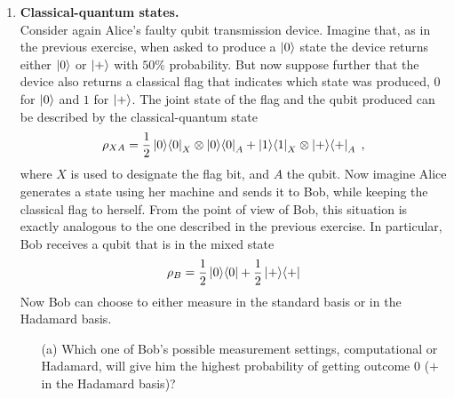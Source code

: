 \documentclass[12pt]{article}
\begin{document}
\begin{enumerate}
\item {\bf Classical-quantum states.}\\
Consider again Alice's faulty qubit transmission device. Imagine that, as in the previous exercise, when asked to produce a $\ket{0}$ state the device returns either $\ket{0}$ or $\ket{+}$ with $50\%$ probability. But now suppose further that the device also returns a classical flag that indicates which state was produced, $0$ for $\ket{0}$ and $1$ for $\ket{+}$. The joint state of the flag and the qubit produced can be described by the classical-quantum state
\begin{equation}
\rho_{XA} = \frac{1}{2}\ket{0}\!\bra{0}_X \otimes\ket{0}\!\bra{0}_A + \ket{1}\!\bra{1}_X\otimes \ket{+}\!\bra{+}_A\;,
\end{equation}
where $X$ is used to designate the flag bit, and $A$ the qubit. 
Now imagine Alice generates a state using her machine and sends it to Bob, while keeping the classical flag to herself. From the point of view of Bob, this situation is exactly analogous to the one described in the previous exercise. In particular, Bob receives a qubit that is in the mixed state
\begin{equation}
\rho_B = \frac{1}{2}\ket{0}\!\bra{0}+ \frac{1}{2}\ket{+}\!\bra{+}
\end{equation}
Now Bob can choose to either measure in the standard basis or in the Hadamard basis.
\begin{enumerate}
\item[(a)] Which one of Bob's possible measurement settings, computational or Hadamard, will give him the highest probability of getting outcome $0$ ($+$ in the Hadamard basis)?
\end{enumerate}

\end{enumerate}
\end{document}
